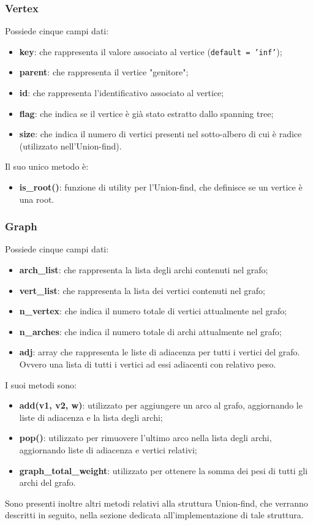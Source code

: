 \subsubsection{Vertex}
Possiede cinque campi dati:
\begin{itemize}
	\item \textbf{key}: che rappresenta il valore associato al vertice (\texttt{default = 'inf'});
	\item \textbf{parent}: che rappresenta il vertice "genitore";
	\item \textbf{id}: che rappresenta l'identificativo associato al vertice;
	\item \textbf{flag}: che indica se il vertice è già stato estratto dallo spanning tree;
	\item \textbf{size}: che indica il numero di vertici presenti nel sotto-albero di cui è radice (utilizzato nell'Union-find).
\end{itemize}
Il suo unico metodo è:
\begin{itemize}
	\item \textbf{is\_root()}: funzione di utility per l'Union-find, che definisce se un vertice è una root.
\end{itemize}
\subsubsection{Graph}
Possiede cinque campi dati:
\begin{itemize}
	\item \textbf{arch\_list}: che rappresenta la lista degli archi contenuti nel grafo;
	\item \textbf{vert\_list}: che rappresenta la lista dei vertici contenuti nel grafo;
	\item \textbf{n\_vertex}: che indica il numero totale di vertici attualmente nel grafo;
	\item \textbf{n\_arches}: che indica il numero totale di archi attualmente nel grafo;
	\item \textbf{adj}: array che rappresenta le liste di adiacenza per tutti i vertici del grafo. Ovvero una lista di tutti i vertici ad essi adiacenti con relativo peso.
\end{itemize}
I suoi metodi sono:
\begin{itemize}
	\item \textbf{add(v1, v2, w)}: utilizzato per aggiungere un arco al grafo, aggiornando le liste di adiacenza e la lista degli archi;
	\item \textbf{pop()}: utilizzato per rimuovere l'ultimo arco nella lista degli archi, aggiornando liste di adiacenza e vertici relativi;
	\item \textbf{graph\_total\_weight}: utilizzato per ottenere la somma dei pesi di tutti gli archi del grafo.
\end{itemize}
Sono presenti inoltre altri metodi relativi alla struttura Union-find, che verranno descritti in seguito, nella sezione dedicata all'implementazione di tale struttura.

